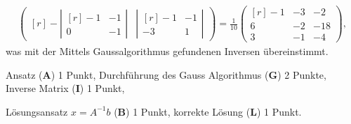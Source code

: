 \begin{loesung}
\begin{align*}
\begin{pmatrix*}[r]
-\left|\begin{matrix*}[r]-1&-1\\ 0&-1\end{matrix*}\right|&
 \left|\begin{matrix*}[r]-1&-1\\-3& 1\end{matrix*}\right|
\end{pmatrix*}
=
\frac1{10}
\begin{pmatrix*}[r]
-1&-3& -2\\
 6&-2&-18\\
 3&-1& -4
\end{pmatrix*},
\end{align*}
was mit der Mittels Gaussalgorithmus gefundenen Inversen übereinstimmt.
\end{loesung}

\begin{bewertung}
\begin{teilaufgaben}
\item
Ansatz (\textbf{A}) 1 Punkt,
Durchführung des Gauss Algorithmus (\textbf{G}) 2 Punkte,
Inverse Matrix (\textbf{I}) 1 Punkt,
\item
Lösungsansatz $x=A^{-1}b$ (\textbf{B}) 1 Punkt,
korrekte Lösung (\textbf{L}) 1 Punkt.
\end{teilaufgaben}
\end{bewertung}

